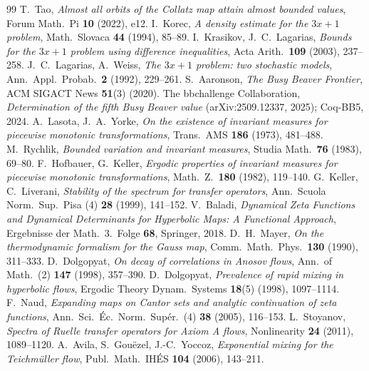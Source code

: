 \documentclass[11pt]{article}
\begin{document}
\begin{thebibliography}{99}
 T.\ Tao, \emph{Almost all orbits of the Collatz map attain almost bounded values}, Forum Math.\ Pi \textbf{10} (2022), e12.
 I.\ Korec, \emph{A density estimate for the $3x+1$ problem}, Math.\ Slovaca \textbf{44} (1994), 85--89.
 I.\ Krasikov, J.\ C.\ Lagarias, \emph{Bounds for the $3x+1$ problem using difference inequalities}, Acta Arith.\ \textbf{109} (2003), 237--258.
 J.\ C.\ Lagarias, A.\ Weiss, \emph{The $3x+1$ problem: two stochastic models}, Ann.\ Appl.\ Probab.\ \textbf{2} (1992), 229--261.
 S.\ Aaronson, \emph{The Busy Beaver Frontier}, ACM SIGACT News \textbf{51}(3) (2020).
 The bbchallenge Collaboration, \emph{Determination of the fifth Busy Beaver value} (arXiv:2509.12337, 2025); Coq-BB5, 2024.
 A.\ Lasota, J.\ A.\ Yorke, \emph{On the existence of invariant measures for piecewise monotonic transformations}, Trans.\ AMS \textbf{186} (1973), 481--488.
 M.\ Rychlik, \emph{Bounded variation and invariant measures}, Studia Math.\ \textbf{76} (1983), 69--80.
 F.\ Hofbauer, G.\ Keller, \emph{Ergodic properties of invariant measures for piecewise monotonic transformations}, Math.\ Z.\ \textbf{180} (1982), 119--140.
 G.\ Keller, C.\ Liverani, \emph{Stability of the spectrum for transfer operators}, Ann.\ Scuola Norm.\ Sup.\ Pisa (4) \textbf{28} (1999), 141--152.
 V.\ Baladi, \emph{Dynamical Zeta Functions and Dynamical Determinants for Hyperbolic Maps: A Functional Approach}, Ergebnisse der Math.\ 3.\ Folge \textbf{68}, Springer, 2018.
 D.\ H.\ Mayer, \emph{On the thermodynamic formalism for the Gauss map}, Comm.\ Math.\ Phys.\ \textbf{130} (1990), 311--333.
 D.\ Dolgopyat, \emph{On decay of correlations in Anosov flows}, Ann.\ of Math.\ (2) \textbf{147} (1998), 357--390.
 D.\ Dolgopyat, \emph{Prevalence of rapid mixing in hyperbolic flows}, Ergodic Theory Dynam.\ Systems \textbf{18}(5) (1998), 1097--1114.
 F.\ Naud, \emph{Expanding maps on Cantor sets and analytic continuation of zeta functions}, Ann.\ Sci.\ \'Ec.\ Norm.\ Sup\'er.\ (4) \textbf{38} (2005), 116--153.
 L.\ Stoyanov, \emph{Spectra of Ruelle transfer operators for Axiom A flows}, Nonlinearity \textbf{24} (2011), 1089--1120.
 A.\ Avila, S.\ Gou\"ezel, J.-C.\ Yoccoz, \emph{Exponential mixing for the Teichm\"uller flow}, Publ.\ Math.\ IH\'ES \textbf{104} (2006), 143--211.

\end{thebibliography}
\end{document}
